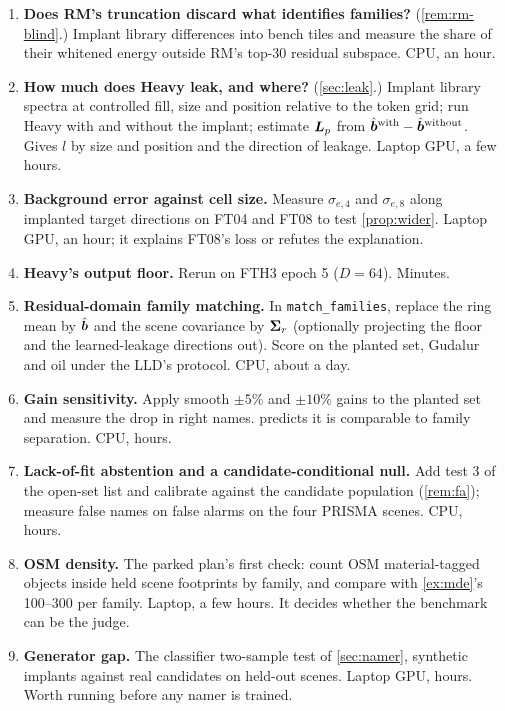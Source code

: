 \documentclass[11pt,a4paper]{article}
\theoremstyle{plain}
\theoremstyle{definition}
\theoremstyle{remark}
\newcommand{\bh}{\hat{\B{b}}}
\newcommand{\Lm}{\B{L}}
\begin{document}
\begin{enumerate}
\item \textbf{Does RM's truncation discard what identifies families?} (\cref{rem:rm-blind}.) Implant library differences into bench
tiles and measure the share of their whitened energy outside RM's top-30 residual subspace. CPU, an hour.
\item \textbf{How much does Heavy leak, and where?} (\cref{sec:leak}.) Implant library spectra at controlled fill, size and position
relative to the token grid; run Heavy with and without the implant; estimate $\Lm_p$ from $\bh^{\rm with}-\bh^{\rm without}$. Gives $l$ by
size and position and the direction of leakage. Laptop GPU, a few hours.
\item \textbf{Background error against cell size.} Measure $\sigma_{e,4}$ and $\sigma_{e,8}$ along implanted target directions on FT04
and FT08 to test \cref{prop:wider}. Laptop GPU, an hour; it explains FT08's loss or refutes the explanation.
\item \textbf{Heavy's output floor.} Rerun  on FTH3 epoch 5 ($D=64$). Minutes.
\item \textbf{Residual-domain family matching.} In \verb|match_families|, replace the ring mean by $\bh$ and the scene covariance by
$\bm{\Sigma}_r$ (optionally projecting the floor and the learned-leakage directions out). Score on the planted set, Gudalur and oil under
the LLD's protocol. CPU, about a day.
\item \textbf{Gain sensitivity.} Apply smooth $\pm5\%$ and $\pm10\%$ gains to the planted set and measure the drop in right names.
 predicts it is comparable to family separation. CPU, hours.
\item \textbf{Lack-of-fit abstention and a candidate-conditional null.} Add test 3 of the open-set list and calibrate against the
candidate population (\cref{rem:fa}); measure false names on false alarms on the four PRISMA scenes. CPU, hours.
\item \textbf{OSM density.} The parked plan's first check: count OSM material-tagged objects inside held scene footprints by
family, and compare with \cref{ex:mde}'s 100--300 per family. Laptop, a few hours. It decides whether the benchmark can be the judge.
\item \textbf{Generator gap.} The classifier two-sample test of \cref{sec:namer}, synthetic implants against real candidates on held-out
scenes. Laptop GPU, hours. Worth running before any namer is trained.
\end{enumerate}
\end{document}
